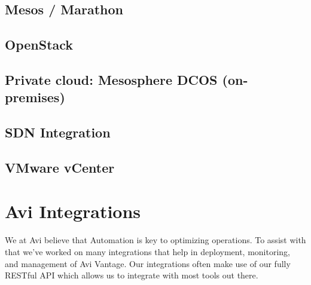 \documentclass[letterpaper,10pt,english]{sphinxmanual}
\begin{document}
\section{Mesos / Marathon}
\label{\detokenize{installation/mesos_marathon:mesos-marathon}}\label{\detokenize{installation/mesos_marathon::doc}}

\section{OpenStack}
\label{\detokenize{installation/openstack:openstack}}\label{\detokenize{installation/openstack::doc}}

\section{Private cloud: Mesosphere DCOS (on-premises)}
\label{\detokenize{installation/private_cloud_mesosphere_dcos::doc}}\label{\detokenize{installation/private_cloud_mesosphere_dcos:private-cloud-mesosphere-dcos-on-premises}}

\section{SDN Integration}
\label{\detokenize{installation/sdn:sdn-integration}}\label{\detokenize{installation/sdn::doc}}

\section{VMware vCenter}
\label{\detokenize{installation/vmware_vcenter:vmware-vcenter}}\label{\detokenize{installation/vmware_vcenter::doc}}

\chapter{Avi Integrations}
\label{\detokenize{integrations/index::doc}}\label{\detokenize{integrations/index:avi-integrations}}
We at Avi believe that Automation is key to optimizing operations. To assist with that we've worked on many integrations that help in deployment, monitoring, and management of Avi Vantage. Our integrations often make use of our fully RESTful API which allows us to integrate with most tools out there.
\end{document}
